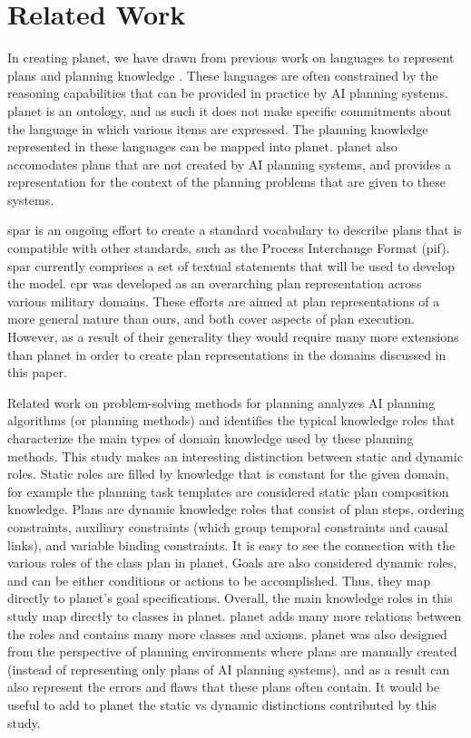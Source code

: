 \section{Related Work}

In creating {\sc planet}, we 
have drawn from previous work on languages 
to represent plans and planning knowledge 
\cite{ghallab98,act,kambhampati-aij95,tate-aips96,yang-90}.  
These languages are often constrained by the reasoning capabilities that
can be provided in practice by AI planning systems.  {\sc planet} is an
ontology, and as such it does not make specific commitments about the
language in which various items are expressed.  The planning knowledge
represented in these languages can be mapped into {\sc planet}.  {\sc
planet} also accomodates plans that are not created by AI planning
systems, and provides a representation for the context of the planning
problems that are given to these systems.

{\sc spar} \cite{SPAR} 
is an ongoing effort to create a standard vocabulary to describe plans
that is compatible with other standards, such as the Process Interchange
Format ({\sc pif}).  {\sc spar} currently comprises a set of textual statements
that will be used to develop the model.  
{\sc cpr} \cite{CPR} was developed as an overarching plan representation 
across various military domains.
These efforts are aimed at
plan representations of a more general nature than ours, 
and both cover aspects of plan execution.  
However, as a result of their generality 
they would require many more extensions than {\sc planet}
in order to create plan representations in the domains
discussed in this paper.  

Related work on problem-solving methods for planning 
\cite{valente-98,nunes-ijcai97}%
analyzes AI planning algorithms (or planning methods) and 
identifies the typical knowledge roles that characterize the main types of 
domain knowledge used by these planning methods.  
This study makes an interesting distinction 
between static and dynamic roles.
Static roles are 
filled by knowledge that is constant for the given domain,
for example the planning task templates are considered
static plan composition knowledge.  
Plans are dynamic knowledge roles 
that consist of plan steps, ordering constraints, 
auxiliary constraints 
(which group temporal constraints and causal links),
and variable binding constraints.  
It is easy to see the connection with the various 
roles of the class plan in {\sc planet}.
Goals are also considered dynamic roles, and 
can be either conditions or actions to be accomplished.
Thus, they map directly to {\sc planet}'s goal specifications.
Overall, the main knowledge roles in this study map directly 
to classes in {\sc planet}.  {\sc planet} adds many more relations between 
the roles and contains many more classes and axioms.
{\sc planet} was also designed from the perspective of 
planning environments where plans are manually created
(instead of representing only plans of AI planning systems), 
and as a result can also represent 
the errors and flaws that these plans often contain.  
It would be useful to add to {\sc planet} the static vs dynamic 
distinctions contributed by this study.

